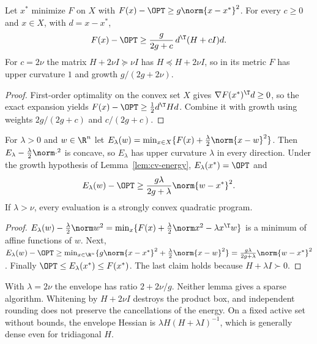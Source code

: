 \begin{lemma}\label{lem:cv-energy}
Let $x^*$ minimize $F$ on $X$ with $F(x)-\OPT\ge g\norm{x-x^*}^2$. For every
$c\ge0$ and $x\in X$, with $d=x-x^*$,
\[
F(x)-\OPT\ge\frac{g}{2g+c}\,d^{\T}(H+cI)d.
\]
For $c=2\nu$ the matrix $H+2\nu I\succeq\nu I$ has $H\preceq H+2\nu I$, so in its
metric $F$ has upper curvature $1$ and growth $g/(2g+2\nu)$.
\end{lemma}

\begin{proof}
First-order optimality on the convex set $X$ gives
$\nabla F(x^*)^{\T}d\ge0$, so the exact expansion yields
$F(x)-\OPT\ge\frac12d^{\T}Hd$. Combine it with growth using weights
$2g/(2g+c)$ and $c/(2g+c)$.
\end{proof}

\begin{lemma}\label{lem:cv-envelope}
For $\lambda>0$ and $w\in\R^n$ let
$E_\lambda(w)=\min_{x\in X}\{F(x)+\frac\lambda2\norm{x-w}^2\}$. Then
$E_\lambda-\frac\lambda2\norm\cdot^2$ is concave, so $E_\lambda$ has upper
curvature $\lambda$ in every direction. Under the growth hypothesis of
Lemma~\ref{lem:cv-energy}, $E_\lambda(x^*)=\OPT$ and
\[
E_\lambda(w)-\OPT\ge\frac{g\lambda}{2g+\lambda}\norm{w-x^*}^2.
\]
If $\lambda>\nu$, every evaluation is a strongly convex quadratic program.
\end{lemma}

\begin{proof}
$E_\lambda(w)-\frac\lambda2\norm w^2=\min_x\{F(x)+\frac\lambda2\norm x^2-\lambda x^{\T}w\}$
is a minimum of affine functions of $w$. Next,
$E_\lambda(w)-\OPT\ge\min_{x\in\R^n}\{g\norm{x-x^*}^2+\frac\lambda2\norm{x-w}^2\}
=\frac{g\lambda}{2g+\lambda}\norm{w-x^*}^2$. Finally $\OPT\le E_\lambda(x^*)\le F(x^*)$.
The last claim holds because $H+\lambda I\succ0$.
\end{proof}

With $\lambda=2\nu$ the envelope has ratio $2+2\nu/g$. Neither lemma gives a
sparse algorithm. Whitening by $H+2\nu I$ destroys the product box, and
independent rounding does not preserve the cancellations of the energy. On a
fixed active set without bounds, the envelope Hessian is
$\lambda H(H+\lambda I)^{-1}$, which is generally dense even for tridiagonal
$H$.
